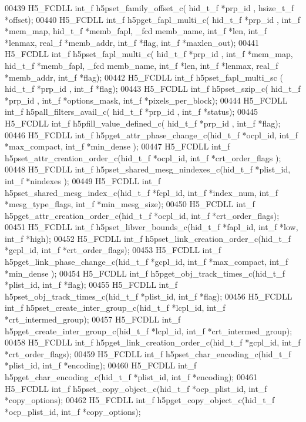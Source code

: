 \begin{DoxyCode}
00439 H5\_FCDLL int\_f h5pset\_family\_offset\_c( hid\_t\_f *prp\_id , hsize\_t\_f *offset);
00440 H5\_FCDLL int\_f h5pget\_fapl\_multi\_c( hid\_t\_f *prp\_id , int\_f *mem\_map, hid\_t\_f *memb\_fapl, \_fcd memb\_name, 
      int\_f *len, int\_f *lenmax, real\_f *memb\_addr, int\_f *flag, int\_f *maxlen\_out);
00441 H5\_FCDLL int\_f h5pset\_fapl\_multi\_c( hid\_t\_f *prp\_id , int\_f *mem\_map, hid\_t\_f *memb\_fapl, \_fcd memb\_name, 
      int\_f *len, int\_f *lenmax, real\_f *memb\_addr, int\_f *flag);
00442 H5\_FCDLL int\_f h5pset\_fapl\_multi\_sc ( hid\_t\_f *prp\_id , int\_f *flag);
00443 H5\_FCDLL int\_f h5pset\_szip\_c( hid\_t\_f *prp\_id , int\_f *options\_mask, int\_f *pixels\_per\_block);
00444 H5\_FCDLL int\_f h5pall\_filters\_avail\_c( hid\_t\_f *prp\_id , int\_f *status);
00445 H5\_FCDLL int\_f h5pfill\_value\_defined\_c( hid\_t\_f *prp\_id , int\_f *flag);
00446 H5\_FCDLL int\_f h5pget\_attr\_phase\_change\_c(hid\_t\_f *ocpl\_id, int\_f *max\_compact, int\_f *min\_dense );
00447 H5\_FCDLL int\_f h5pset\_attr\_creation\_order\_c(hid\_t\_f *ocpl\_id, int\_f *crt\_order\_flags );
00448 H5\_FCDLL int\_f h5pset\_shared\_mesg\_nindexes\_c(hid\_t\_f *plist\_id, int\_f *nindexes );
00449 H5\_FCDLL int\_f h5pset\_shared\_mesg\_index\_c(hid\_t\_f *fcpl\_id, int\_f *index\_num, int\_f *mesg\_type\_flags, int\_f
       *min\_mesg\_size);
00450 H5\_FCDLL int\_f h5pget\_attr\_creation\_order\_c(hid\_t\_f *ocpl\_id, int\_f *crt\_order\_flags);
00451 H5\_FCDLL int\_f h5pset\_libver\_bounds\_c(hid\_t\_f *fapl\_id, int\_f *low, int\_f *high);
00452 H5\_FCDLL int\_f h5pset\_link\_creation\_order\_c(hid\_t\_f *gcpl\_id, int\_f *crt\_order\_flags);
00453 H5\_FCDLL int\_f h5pget\_link\_phase\_change\_c(hid\_t\_f *gcpl\_id, int\_f *max\_compact, int\_f *min\_dense );
00454 H5\_FCDLL int\_f h5pget\_obj\_track\_times\_c(hid\_t\_f *plist\_id, int\_f *flag);
00455 H5\_FCDLL int\_f h5pset\_obj\_track\_times\_c(hid\_t\_f *plist\_id, int\_f *flag);
00456 H5\_FCDLL int\_f h5pset\_create\_inter\_group\_c(hid\_t\_f *lcpl\_id, int\_f *crt\_intermed\_group);
00457 H5\_FCDLL int\_f h5pget\_create\_inter\_group\_c(hid\_t\_f *lcpl\_id, int\_f *crt\_intermed\_group);
00458 H5\_FCDLL int\_f h5pget\_link\_creation\_order\_c(hid\_t\_f *gcpl\_id, int\_f *crt\_order\_flags);
00459 H5\_FCDLL int\_f h5pset\_char\_encoding\_c(hid\_t\_f *plist\_id, int\_f *encoding);
00460 H5\_FCDLL int\_f h5pget\_char\_encoding\_c(hid\_t\_f *plist\_id, int\_f *encoding);
00461 H5\_FCDLL int\_f h5pset\_copy\_object\_c(hid\_t\_f *ocp\_plist\_id, int\_f *copy\_options);
00462 H5\_FCDLL int\_f h5pget\_copy\_object\_c(hid\_t\_f *ocp\_plist\_id, int\_f *copy\_options);

\end{DoxyCode}
